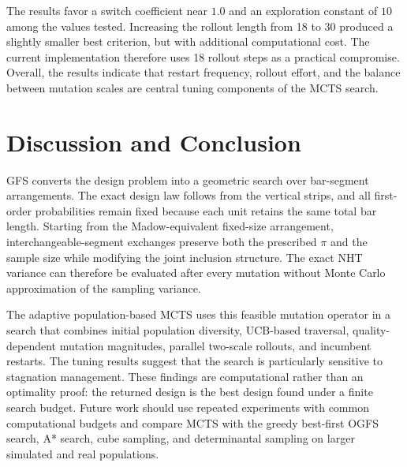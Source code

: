 \documentclass[twoside]{article}
\begin{document}
The results favor a switch coefficient near $1.0$ and an exploration constant
of $10$ among the values tested. Increasing the rollout length from 18 to 30
produced a slightly smaller best criterion, but with additional computational
cost. The current implementation therefore uses 18 rollout steps as a practical
compromise. Overall, the results indicate that restart frequency, rollout effort,
and the balance between mutation scales are central tuning components of the
MCTS search.

\section*{Discussion and Conclusion}

GFS converts the design problem into a geometric search over bar-segment
arrangements. The exact design law follows from the vertical strips, and all
first-order probabilities remain fixed because each unit retains the same total
bar length. Starting from the Madow-equivalent fixed-size arrangement,
interchangeable-segment exchanges preserve both the prescribed $\pi$ and the
sample size while modifying the joint inclusion structure. The exact NHT
variance can therefore be evaluated after every mutation without Monte Carlo
approximation of the sampling variance.

The adaptive population-based MCTS uses this feasible mutation operator in a
search that combines initial population diversity, UCB-based traversal,
quality-dependent mutation magnitudes, parallel two-scale rollouts, and
incumbent restarts. The tuning results suggest that the search is particularly
sensitive to stagnation management. These findings are computational rather
than an optimality proof: the returned design is the best design found under a
finite search budget. Future work should use repeated experiments with common
computational budgets and compare MCTS with the greedy best-first OGFS search,
A* search, cube sampling, and determinantal sampling on larger simulated and
real populations.
\end{document}
